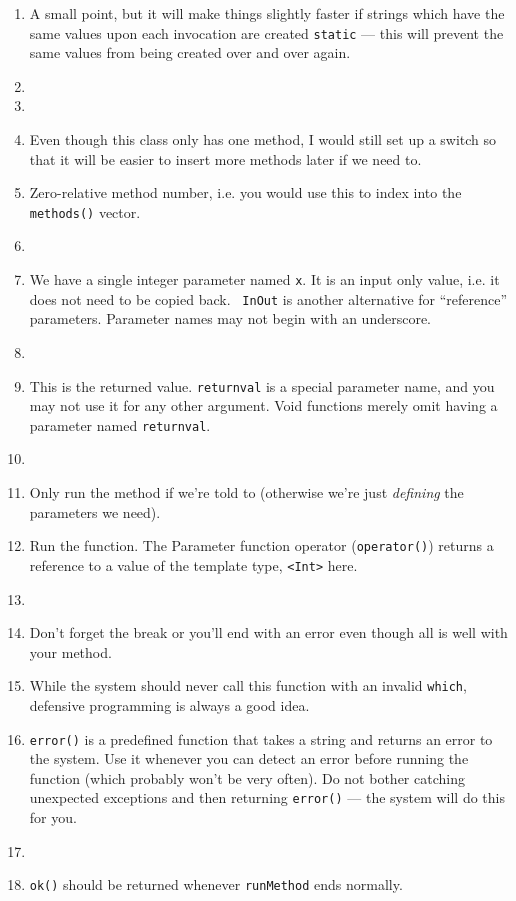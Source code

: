 \begin{enumerate}
    \item A small point, but it will make things slightly faster if strings
          which have the same values upon each invocation are created
          {\tt static} --- this will prevent the same values from being
          created over and over again.
    \item
    \item
    \item Even though this class only has one method, I would still set
          up a switch so that it will be easier to insert more methods
          later if we need to.
    \item Zero-relative method number, i.e. you would use this to index
          into the {\tt methods()} vector.
    \item
    \item We have a single integer parameter named {\tt x}. It is an
          input only value, i.e. it does not need to be copied back. {\tt
          InOut} is another alternative for ``reference''
          parameters. Parameter names may not begin with an underscore.
    \item
    \item This is the returned value. {\tt returnval} is a special
          parameter name, and you may not use it for any other
          argument. Void functions merely omit having a parameter named
          {\tt returnval}.
    \item
    \item Only run the method if we're told to (otherwise we're just
          {\em defining} the parameters we need).
    \item Run the function. The Parameter function operator 
          ({\tt operator()}) returns 
          a reference to
          a value of the template type, {\tt <Int>} here.
    \item 
    \item Don't forget the break or you'll end with an error even though all
          is well with your method.
    \item While the system should never call this function with an invalid
          {\tt which}, defensive programming is always a good idea.
    \item {\tt error()} is a predefined function that takes a string and
          returns an error to the system. Use it whenever you can detect
          an error before running the function (which probably won't be
          very often). Do not bother catching unexpected exceptions and then
          returning {\tt error()} --- the system will do this for you.
    \item
    \item {\tt ok()} should be returned whenever {\tt runMethod} ends
          normally.
\end{enumerate}

